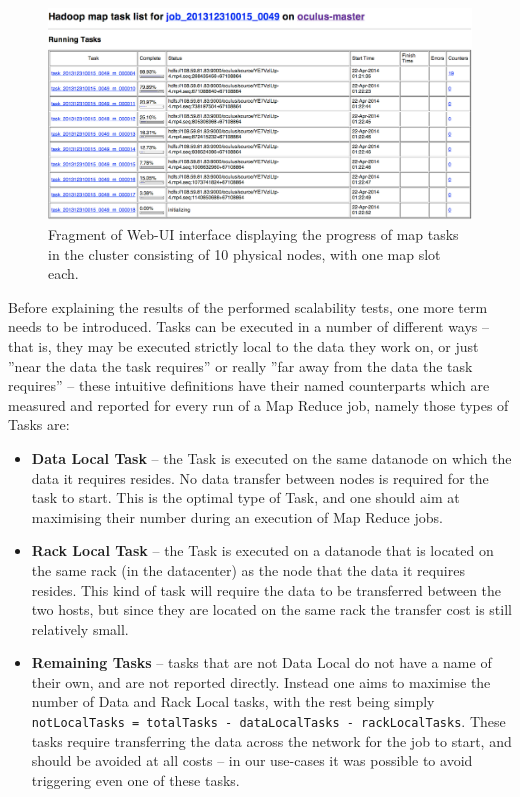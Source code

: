 \begin{figure}[ch!]
  \centering
  \includegraphics[width=\textwidth]{img/hadoop/10tasks-parallel}
  \caption{Fragment of Web-UI interface displaying the progress of map tasks in the cluster consisting of 10 physical nodes, with one map slot each.}
  \label{fig:ten-mappers-executing-map}
\end{figure}

Before explaining the results of the performed scalability tests, one more term needs to be introduced. Tasks can be executed in a number of different ways -- that is, they may be executed strictly local to the data they work on, or just ''near the data the task requires'' or really ''far away from the data the task requires'' -- these intuitive definitions have their named counterparts which are measured and reported for every run of a Map Reduce job, namely those types of Tasks are:

\newpage
\begin{itemize}
  \item \textbf{Data Local Task} -- the Task is executed on the same datanode on which the data it requires resides. No data transfer between nodes is required for the task to start. This is the optimal type of Task, and one should aim at maximising their number during an execution of Map Reduce jobs.
  \item \textbf{Rack Local Task} -- the Task is executed on a datanode that is located on the same rack (in the datacenter) as the node that the data it requires resides. This kind of task will require the data to be transferred between the two hosts, but since they are located on the same rack the transfer cost is still relatively small.
  \item \textbf{Remaining Tasks} -- tasks that are not Data Local do not have a name of their own, and are not reported directly. Instead one aims to maximise the number of Data and Rack Local tasks, with the rest being simply \verb|notLocalTasks = totalTasks - dataLocalTasks - rackLocalTasks|. These tasks require transferring the data across the network for the job to start, and should be avoided at all costs -- in our use-cases it was possible to avoid triggering even one of these tasks.
\end{itemize}

